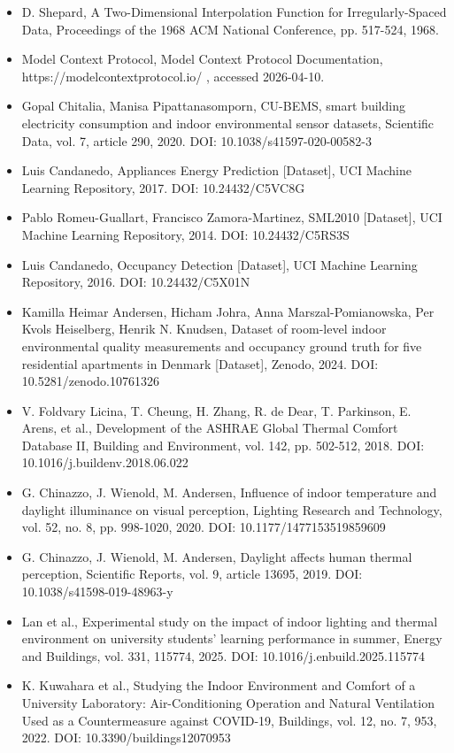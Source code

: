\documentclass[12pt,a4paper]{article}
\begin{document}
\begin{itemize}
\item [10] D. Shepard, A Two-Dimensional Interpolation Function for Irregularly-Spaced Data, Proceedings of the 1968 ACM National Conference, pp. 517-524, 1968.
\item [11] Model Context Protocol, Model Context Protocol Documentation, https://modelcontextprotocol.io/ , accessed 2026-04-10.
\item [12] Gopal Chitalia, Manisa Pipattanasomporn, CU-BEMS, smart building electricity consumption and indoor environmental sensor datasets, Scientific Data, vol. 7, article 290, 2020. DOI: 10.1038/s41597-020-00582-3
\item [13] Luis Candanedo, Appliances Energy Prediction [Dataset], UCI Machine Learning Repository, 2017. DOI: 10.24432/C5VC8G
\item [14] Pablo Romeu-Guallart, Francisco Zamora-Martinez, SML2010 [Dataset], UCI Machine Learning Repository, 2014. DOI: 10.24432/C5RS3S
\item [15] Luis Candanedo, Occupancy Detection [Dataset], UCI Machine Learning Repository, 2016. DOI: 10.24432/C5X01N
\item [16] Kamilla Heimar Andersen, Hicham Johra, Anna Marszal-Pomianowska, Per Kvols Heiselberg, Henrik N. Knudsen, Dataset of room-level indoor environmental quality measurements and occupancy ground truth for five residential apartments in Denmark [Dataset], Zenodo, 2024. DOI: 10.5281/zenodo.10761326
\item [17] V. Foldvary Licina, T. Cheung, H. Zhang, R. de Dear, T. Parkinson, E. Arens, et al., Development of the ASHRAE Global Thermal Comfort Database II, Building and Environment, vol. 142, pp. 502-512, 2018. DOI: 10.1016/j.buildenv.2018.06.022
\item [18] G. Chinazzo, J. Wienold, M. Andersen, Influence of indoor temperature and daylight illuminance on visual perception, Lighting Research and Technology, vol. 52, no. 8, pp. 998-1020, 2020. DOI: 10.1177/1477153519859609
\item [19] G. Chinazzo, J. Wienold, M. Andersen, Daylight affects human thermal perception, Scientific Reports, vol. 9, article 13695, 2019. DOI: 10.1038/s41598-019-48963-y
\item [20] Lan et al., Experimental study on the impact of indoor lighting and thermal environment on university students' learning performance in summer, Energy and Buildings, vol. 331, 115774, 2025. DOI: 10.1016/j.enbuild.2025.115774
\item [21] K. Kuwahara et al., Studying the Indoor Environment and Comfort of a University Laboratory: Air-Conditioning Operation and Natural Ventilation Used as a Countermeasure against COVID-19, Buildings, vol. 12, no. 7, 953, 2022. DOI: 10.3390/buildings12070953

\end{itemize}
\end{document}
